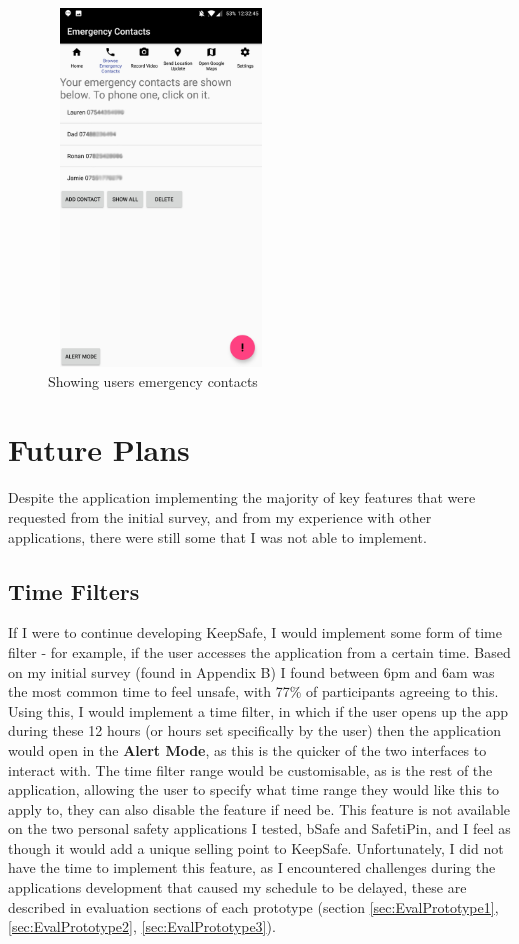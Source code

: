 \documentclass[a4paper]{report}
\begin{document}
	\begin{figure}[H]
		\centering
	\includegraphics[width=6cm, height=9.5cm]{emergContactsSafe}
	\caption{Showing users emergency contacts}
	\label{fig:emergContacts}
	\end{figure}
	
	\chapter{Future Plans} 
\label{sec:FuturePlans}
Despite the application implementing the majority of key features that were requested from the initial survey, and from my experience with other applications, there were still some that I was not able to implement. 
\section{Time Filters}
\label{sec:TimeFilters}
If I were to continue developing KeepSafe, I would implement some form of time filter - for example, if the user accesses the application from a certain time. Based on my initial survey (found in Appendix B) I found between 6pm and 6am was the most common time to feel unsafe, with 77\% of participants agreeing to this. Using this, I would implement a time filter, in which if the user opens up the app during these 12 hours (or hours set specifically by the user) then the application would open in the \textbf{Alert Mode}, as this is the quicker of the two interfaces to interact with. The time filter range would be customisable, as is the rest of the application, allowing the user to specify what time range they would like this to apply to, they can also disable the feature if need be. This feature is not available on the two personal safety applications I tested, bSafe\cite{bSafe} and SafetiPin, \cite{safetipin} and I feel as though it would add a unique selling point to KeepSafe. Unfortunately, I did not have the time to implement this feature, as I encountered challenges during the applications development that caused my schedule to be delayed, these are described in evaluation sections of each prototype (section \ref{sec:EvalPrototype1}, \ref{sec:EvalPrototype2}, \ref{sec:EvalPrototype3}). 
\end{document}
